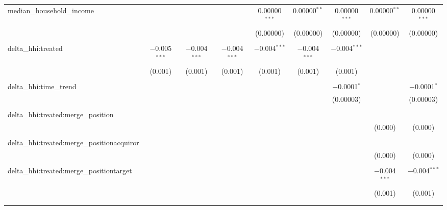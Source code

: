 \begin{table}[H]
{\begin{tabular}{@{\extracolsep{5pt}}lcccccccc}
  median\_household\_income &  &  &  & 0.00000$^{***}$ & 0.00000$^{**}$ & 0.00000$^{***}$ & 0.00000$^{**}$ & 0.00000$^{***}$ \\  

   &  &  &  & (0.00000) & (0.00000) & (0.00000) & (0.00000) & (0.00000) \\  

   & & & & & & & & \\  

  delta\_hhi:treated & $-$0.005$^{***}$ & $-$0.004$^{***}$ & $-$0.004$^{***}$ & $-$0.004$^{***}$ & $-$0.004$^{***}$ & $-$0.004$^{***}$ &  &  \\  

   & (0.001) & (0.001) & (0.001) & (0.001) & (0.001) & (0.001) &  &  \\  

   & & & & & & & & \\  

  delta\_hhi:time\_trend &  &  &  &  &  & $-$0.0001$^{*}$ &  & $-$0.0001$^{*}$ \\  

   &  &  &  &  &  & (0.00003) &  & (0.00003) \\  

   & & & & & & & & \\  

  delta\_hhi:treated:merge\_position &  &  &  &  &  &  &  &  \\  

   &  &  &  &  &  &  & (0.000) & (0.000) \\  

   & & & & & & & & \\  

  delta\_hhi:treated:merge\_positionacquiror &  &  &  &  &  &  &  &  \\  

   &  &  &  &  &  &  & (0.000) & (0.000) \\  

   & & & & & & & & \\  

  delta\_hhi:treated:merge\_positiontarget &  &  &  &  &  &  & $-$0.004$^{***}$ & $-$0.004$^{***}$ \\  

   &  &  &  &  &  &  & (0.001) & (0.001) \\  

   & & & & & & & & \\  

 \hline \\[-1.8ex]  


\end{tabular}}
\end{table}
